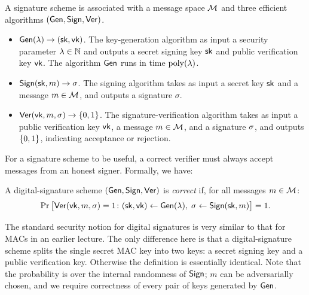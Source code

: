 \begin{definition}
	A signature scheme is associated with a message space $\mathcal{M}$ and three efficient algorithms $(\mathsf{Gen}, \mathsf{Sign}, \mathsf{Ver})$.

	\begin{itemize}
    \item $\mathsf{Gen}(\lambda) \to ({\mathsf{sk}}, \mathsf{vk})$.
      The key-generation algorithm as input a security parameter $\lambda \in \mathbb{N}$ and outputs a secret signing key ${\mathsf{sk}}$ and public verification key $\mathsf{vk}$.
      The algorithm $\mathsf{Gen}$ runs in time $\operatorname{poly}(\lambda)$.
    \item $\mathsf{Sign}({\mathsf{sk}}, m) \to \sigma$.
      The signing algorithm takes as input a secret key ${\mathsf{sk}}$ and a message $m \in \mathcal{M}$, and outputs a signature $\sigma$.
    \item $\mathsf{Ver}(\mathsf{vk}, m, \sigma) \to \{0,1\}$.
      The signature-verification algorithm takes as input a public verification key $\mathsf{vk}$, a message $m \in \mathcal{M}$, and a signature $\sigma$, 
      and outputs $\{0,1\}$, indicating acceptance or rejection.
	\end{itemize}
	
\end{definition}

For a signature scheme to be useful, a correct verifier must always accept messages from an
honest signer. Formally, we have:

\begin{definition}
  A digital-signature scheme $(\mathsf{Gen}, \mathsf{Sign}, \mathsf{Ver})$ is \emph{correct} if,
  for all messages $m \in \mathcal{M}$:
\[ \Pr\big[\mathsf{Ver}(\mathsf{vk}, m, \sigma) = 1 \colon ({\mathsf{sk}}, \mathsf{vk}) \gets \mathsf{Gen}(\lambda),\;
   \sigma \gets \mathsf{Sign}({\mathsf{sk}}, m) \big] = 1. \]
\end{definition}

The standard security notion for digital signatures is very similar
to that for MACs in an earlier lecture. %
The only difference here is that a digital-signature scheme splits the single
secret MAC key into two keys: a secret signing key and a public verification key.
Otherwise the definition is essentially identical. Note that the probability is over the internal randomness of $\mathsf{Sign}$; $m$ can be adversarially chosen, and we require correctness of every pair of keys generated by $\mathsf{Gen}$.

